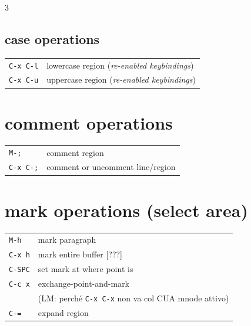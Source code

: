 \documentclass[11pt,landscape,a4paper]{article}
\begin{document}
\begin{multicols}{3}
\subsection{case operations}

\begin{tabular}{@{}ll@{}}
	{\color{cblue}\verb|C-x C-l|} 		& lowercase region  (\textit{re-enabled keybindings})\\
	{\color{cblue}\verb|C-x C-u|} 		& uppercase region (\textit{re-enabled keybindings})\\
\end{tabular}

\section{comment operations}
\begin{tabular}{@{}ll@{}}
	{\verb|M-;|} 						& comment region \\ 
	{\verb|C-x C-;|} 						& comment or uncomment line/region\\ 
\end{tabular}


\vfill\null

\section{mark operations (select area)}

\begin{tabular}{@{}ll@{}}
	{\verb|M-h|} 		&  mark paragraph\\ 
	{\color{gray}\verb|C-x h|} & mark entire buffer [???]\\ %
	{\verb|C-SPC|}	&  set mark at where point is\\  %
	{\color{darkred}\verb|C-c x|} & exchange-point-and-mark \\
	& (LM: perché \verb|C-x C-x| non va col CUA mnode attivo)\\
	{\color{orange}\verb|C-=|} 		&  expand region\\ 
\end{tabular}



\end{multicols}
\end{document}
